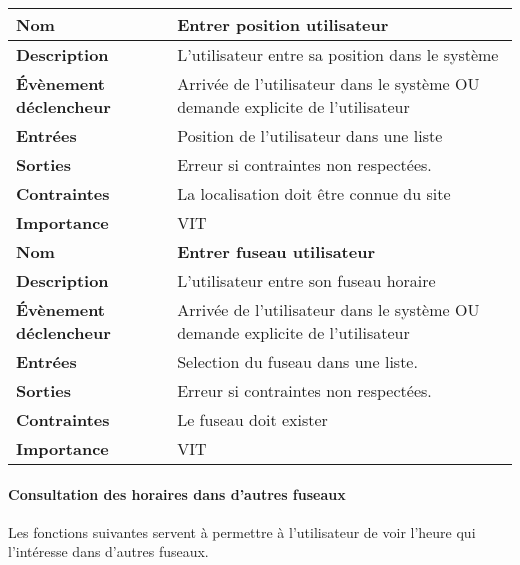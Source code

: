 \documentclass[majeure,gl]{tb}
\begin{document}
\begin{table}[ht]
  \centering
  \begin{tabular}[c]{|p{3cm}|p{13cm}|}
 \hline
 \textbf{Nom} &
 \textbf{Entrer position utilisateur}
 \\\hline
 \textbf{Description} &
 L'utilisateur entre sa position dans le système
 \\\hline
 \textbf{Évènement déclencheur} &
 Arrivée de l'utilisateur dans le système OU demande explicite de l'utilisateur
 \\\hline
 
 \textbf{Entrées} &
 Position de l'utilisateur dans une liste
 \\\hline
 \textbf{Sorties} &
 Erreur si contraintes non respectées.
 \\\hline
 \textbf{Contraintes} &
 La localisation doit être connue du site
 \\\hline
 \textbf{Importance} &
 VIT
 \\\hline 
 
 \hline
 \textbf{Nom} &
 \textbf{Entrer fuseau utilisateur}
 \\\hline
 \textbf{Description} &
 L'utilisateur entre son fuseau horaire
 \\\hline
 \textbf{Évènement déclencheur} &
 Arrivée de l'utilisateur dans le système OU demande explicite de l'utilisateur
 \\\hline
 
 \textbf{Entrées} &
 Selection du fuseau dans une liste.
 \\\hline
 \textbf{Sorties} &
 Erreur si contraintes non respectées.
 \\\hline
 \textbf{Contraintes} &
 Le fuseau doit exister
 \\\hline
 \textbf{Importance} &
 VIT
 \\\hline 

          \end{tabular}
\end{table}


 \paragraph{Consultation des horaires dans d'autres fuseaux} Les fonctions suivantes servent à permettre à l'utilisateur de voir l'heure qui l'intéresse dans d'autres fuseaux.
 
\end{document}
